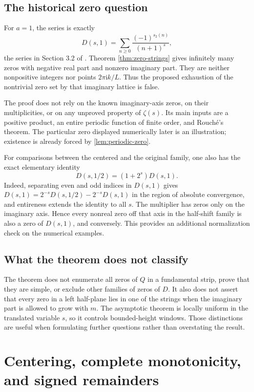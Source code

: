 \documentclass[11pt,a4paper]{article}
\numberwithin{equation}{section}
\theoremstyle{definition}
\theoremstyle{remark}
\newcommand{\ii}{\mathrm i}
\begin{document}
\subsection{The historical zero question}
For $a=1$, the series is exactly
\[
 D(s,1)=\sum_{n\ge0}\frac{(-1)^{s_2(n)}}{(n+1)^s},
\]
the series in Section 3.2 of \cite{AlloucheQuestions}.
Theorem \ref{thm:zero-strings} gives infinitely many zeros with
negative real part and nonzero imaginary part. They are neither
nonpositive integers nor points $2\pi\ii k/L$. Thus the proposed
exhaustion of the nontrivial zero set by that imaginary lattice is
false.

The proof does not rely on the known imaginary-axis zeros, on their
multiplicities, or on any unproved property of $\zeta(s)$. Its main
inputs are a positive product, an entire periodic function of finite
order, and Rouch\'e's theorem. The particular zero displayed
numerically later is an illustration; existence is already forced by
\cref{lem:periodic-zero}.

For comparisons between the centered and the original family, one
also has the exact elementary identity
\begin{equation}
 \boxed{D(s,1/2)=(1+2^s)D(s,1).}
 \label{eq:half-one}
\end{equation}
Indeed, separating even and odd indices in $D(s,1)$ gives
$D(s,1)=2^{-s}D(s,1/2)-2^{-s}D(s,1)$ in the region of absolute
convergence, and entireness extends the identity to all $s$.
The multiplier has zeros only on the imaginary axis. Hence every
nonreal zero off that axis in the half-shift family is also a zero
of $D(s,1)$, and conversely. This provides an additional normalization
check on the numerical examples.

\subsection{What the theorem does not classify}
The theorem does not enumerate all zeros of $Q$ in a fundamental
strip, prove that they are simple, or exclude other families of
zeros of $D$. It also does not assert that every zero in a left
half-plane lies in one of the strings when the imaginary part is
allowed to grow with $m$. The asymptotic theorem is locally uniform
in the translated variable $s$, so it controls bounded-height
windows. Those distinctions are useful when formulating further
questions rather than overstating the result.

\section{Centering, complete monotonicity, and signed remainders}
\label{sec:center}
\end{document}
